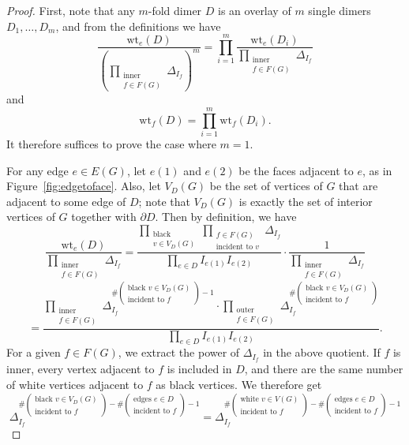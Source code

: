 \documentclass[11pt]{article}
\theoremstyle{definition}
\numberwithin{equation}{section}
\numberwithin{equation}{section}
\begin{document}
\begin{proof}
First, note that any $m$-fold dimer $D$ is an overlay of $m$ single dimers $D_1,\dots,D_m$, and from the definitions we have
\[\frac{\text{wt}_e(D)}{\left(\prod_{\substack{\text{inner }\\f \in F(G)}} \Delta_{I_f}\right)^m}=\prod_{i=1}^m \frac{\text{wt}_e(D_i)}{\prod_{\substack{\text{inner }\\f \in F(G)}} \Delta_{I_f}}\]
and
\[\text{wt}_f(D)=\prod_{i=1}^m \text{wt}_f(D_i).\]
It therefore suffices to prove the case where $m=1$.

For any edge $e \in E(G)$, let $e(1)$ and $e(2)$ be the faces adjacent to $e$, as in Figure~\ref{fig:edgetoface}. Also, let $V_D(G)$ be the set of vertices of $G$ that are adjacent to some edge of $D$; note that $V_D(G)$ is exactly the set of interior vertices of $G$ together with $\partial D$. Then by definition, we have
\[\frac{\text{wt}_e(D)}{\prod_{\substack{\text{inner }\\f \in F(G)}} \Delta_{I_f}}=\frac{\prod_{\substack{\text{black}\\v \in V_D(G)}}\prod_{\substack{\text{$f \in F(G)$}\\\text{incident to }v}} \Delta_{I_f}}{\prod_{e \in D}I_{e(1)}I_{e(2)}}\cdot \frac{1}{\prod_{\substack{\text{inner }\\f \in F(G)}} \Delta_{I_f}}\]
\[=\frac{\prod_{\substack{\text{inner }\\f \in F(G)}} \Delta_{I_f}^{\#\left(\substack{\text{black }v \in V_D(G)\\\text{incident to }f}\right)-1} \cdot\prod_{\substack{\text{outer }\\f \in F(G)}} \Delta_{I_f}^{\#\left(\substack{\text{black }v \in V_D(G)\\\text{incident to }f}\right)}}
{\prod_{e \in D} I_{e(1)}I_{e(2)}}.\]
For a given $f \in F(G)$, we extract the power of $\Delta_{I_f}$ in the above quotient. If $f$ is inner, every vertex adjacent to $f$ is included in $D$, and there are the same number of white vertices adjacent to $f$ as black vertices. We therefore get
\[\Delta_{I_f}^{\#\left(\substack{\text{black }v \in V_D(G)\\\text{incident to }f}\right)-\#\left(\substack{\text{edges }e \in D\\\text{incident to }f}\right)-1} =\Delta_{I_f}^{\#\left(\substack{\text{white }v \in V(G)\\\text{incident to }f}\right)-\#\left(\substack{\text{edges }e \in D\\\text{incident to }f}\right)-1}\]

\end{proof}
\end{document}
